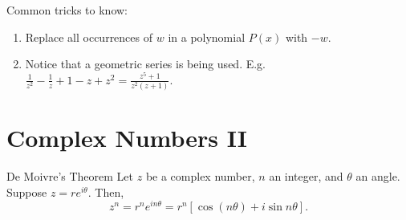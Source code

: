 \documentclass[oneside]{book}
\begin{document}
  \begin{note}
    Common tricks to know:
    \begin{enumerate}
      \item Replace all occurrences of \(w\) in a polynomial \(P(x)\) with \(-w\).
      \item Notice that a geometric series is being used. E.g. \(\frac{1}{z^2}-\frac{1}{z}+1-z+z^2=\frac{z^5+1}{z^2(z+1)}\). 
    \end{enumerate}
  \end{note}
\section{Complex Numbers II}
\begin{theorem}{De Moivre's Theorem}{}
  Let \(z\) be a complex number, \(n\) an integer, and \(\theta\) an angle. Suppose \(z=re^{i\theta}\). Then, 
  \[z^n=r^ne^{in\theta}=r^n[\cos(n\theta)+i\sin{n\theta}].\]
\end{theorem}
\end{document}
